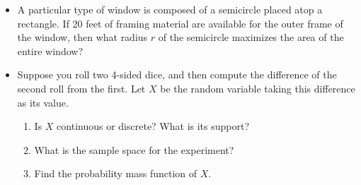 \documentclass[11pt]{article}
\begin{document}
\begin{itemize}
\begin{enumerate}
        \item[(b)] 
            $\displaystyle\lim_{x\to0} \frac{\ln(1+x)-e^{2x}}{x-1}$
            \hspace{1cm}
            \textbf{form:} \rule[-6pt]{1.25in}{0.4pt} \quad
            \textbf{value:} \rule[-6pt]{1.25in}{0.4pt}
            \vspace{5cm}

        \item[(c)] 
            $\displaystyle\lim_{x\to 0^{+}} \frac{\sqrt{1+x}}{\ln(x)}$
            \hspace{1cm}
            \textbf{form:} \rule[-6pt]{1.25in}{0.4pt} \quad
            \textbf{value:} \rule[-6pt]{1.25in}{0.4pt}
            \vspace{0.3in}
    \end{enumerate}        \pagebreak

\item[\textbf{A3.}] A particular type of window is composed of a semicircle placed atop a rectangle. If 20 feet of framing material are available for the outer frame of the window, then what radius $r$ of the semicircle maximizes the area of the entire window?\\

            \pagebreak

\item[\textbf{P1.}] Suppose you roll two 4-sided dice, and then compute the difference of the second roll from the first. Let \( X \) be the random variable taking this difference as its value.
    \begin{enumerate}[label=(\alph*)]

        \item Is \( X \) continuous or discrete? What is its support?
            \vspace{3cm}

        \item What is the sample space for the experiment?
            \vspace{3cm}

        \item Find the probability mass function of \( X \).
            \vspace{5cm}


\end{enumerate}
\end{itemize}
\end{document}
